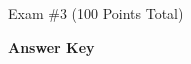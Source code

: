 \documentclass{article}
\begin{document}
\begin{EXAM}






\end{EXAM}

\begin{center}
\Large Exam \#3 (100 Points Total) \begin{KEY}\textbf{Answer Key}\end{KEY}
\end{center}
\normalsize
\bigskip
\end{document}

